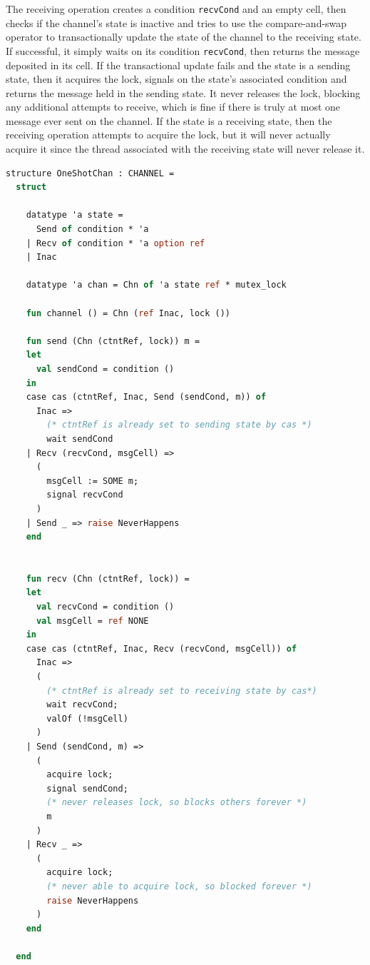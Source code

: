 \documentclass[letterpaper, 11pt]{report}
\begin{document}
The receiving operation creates a condition \lstinline{recvCond} and an empty cell,
then checks if the channel's state is inactive and tries to use the
compare-and-swap operator to transactionally update the state of the channel to
the receiving state. If successful, it simply waits on its condition \lstinline{recvCond},
then returns the message deposited in its cell.
If the transactional update fails and the state is a sending state,
then it acquires the lock, signals on the state's associated condition and returns the message
held in the sending state. It never releases the lock, blocking any additional attempts to receive,
which is fine if there is truly at most one message ever sent on the channel.
If the state is a receiving state, then the receiving operation attempts to acquire the lock,
but it will never actually acquire it since the thread associated with the receiving state will
never release it.


\begin{lstlisting}[language=ML, mathescape]
  structure OneShotChan : CHANNEL =
  struct

    datatype 'a state =
      Send of condition * 'a
    | Recv of condition * 'a option ref
    | Inac  

    datatype 'a chan = Chn of 'a state ref * mutex_lock

    fun channel () = Chn (ref Inac, lock ())

    fun send (Chn (ctntRef, lock)) m =
    let
      val sendCond = condition ()
    in
    case cas (ctntRef, Inac, Send (sendCond, m)) of
      Inac =>
        (* ctntRef is already set to sending state by cas *)
        wait sendCond
    | Recv (recvCond, msgCell) =>
      (
        msgCell := SOME m;
        signal recvCond
      )
    | Send _ => raise NeverHappens
    end


    fun recv (Chn (ctntRef, lock)) =
    let
      val recvCond = condition ()
      val msgCell = ref NONE 
    in
    case cas (ctntRef, Inac, Recv (recvCond, msgCell)) of
      Inac =>
      (
        (* ctntRef is already set to receiving state by cas*)
        wait recvCond;
        valOf (!msgCell)
      )
    | Send (sendCond, m) =>
      (
        acquire lock;
        signal sendCond;
        (* never releases lock, so blocks others forever *)
        m
      )
    | Recv _ =>
      (
        acquire lock;
        (* never able to acquire lock, so blocked forever *)
        raise NeverHappens
      )
    end

  end
\end{lstlisting}
\end{document}
